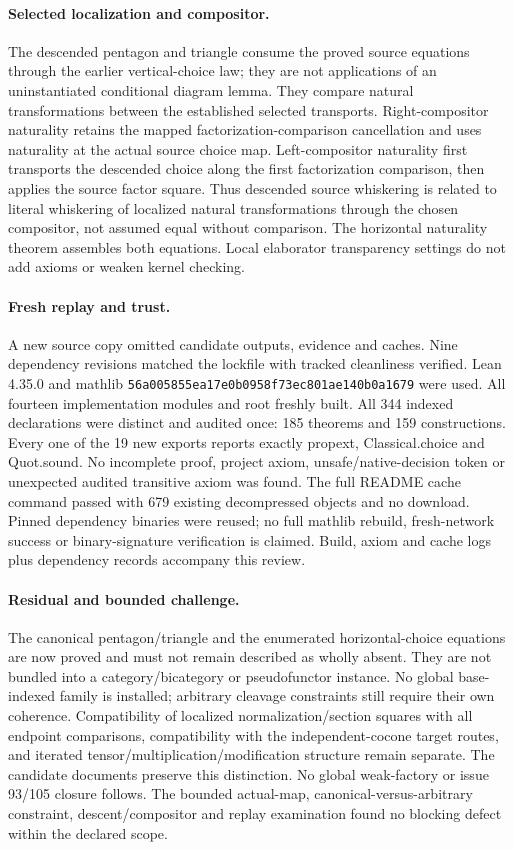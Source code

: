 \documentclass{article}
\begin{document}
\paragraph{Selected localization and compositor.} The descended pentagon and triangle consume the proved source equations through the earlier vertical-choice law; they are not applications of an uninstantiated conditional diagram lemma. They compare natural transformations between the established selected transports. Right-compositor naturality retains the mapped factorization-comparison cancellation and uses naturality at the actual source choice map. Left-compositor naturality first transports the descended choice along the first factorization comparison, then applies the source factor square. Thus descended source whiskering is related to literal whiskering of localized natural transformations through the chosen compositor, not assumed equal without comparison. The horizontal naturality theorem assembles both equations. Local elaborator transparency settings do not add axioms or weaken kernel checking.
\paragraph{Fresh replay and trust.} A new source copy omitted candidate outputs, evidence and caches. Nine dependency revisions matched the lockfile with tracked cleanliness verified. Lean 4.35.0 and mathlib \texttt{56a005855ea17e0b0958f73ec801ae140b0a1679} were used. All fourteen implementation modules and root freshly built. All 344 indexed declarations were distinct and audited once: 185 theorems and 159 constructions. Every one of the 19 new exports reports exactly propext, Classical.choice and Quot.sound. No incomplete proof, project axiom, unsafe/native-decision token or unexpected audited transitive axiom was found. The full README cache command passed with 679 existing decompressed objects and no download. Pinned dependency binaries were reused; no full mathlib rebuild, fresh-network success or binary-signature verification is claimed. Build, axiom and cache logs plus dependency records accompany this review.
\paragraph{Residual and bounded challenge.} The canonical pentagon/triangle and the enumerated horizontal-choice equations are now proved and must not remain described as wholly absent. They are not bundled into a category/bicategory or pseudofunctor instance. No global base-indexed family is installed; arbitrary cleavage constraints still require their own coherence. Compatibility of localized normalization/section squares with all endpoint comparisons, compatibility with the independent-cocone target routes, and iterated tensor/multiplication/modification structure remain separate. The candidate documents preserve this distinction. No global weak-factory or issue 93/105 closure follows. The bounded actual-map, canonical-versus-arbitrary constraint, descent/compositor and replay examination found no blocking defect within the declared scope.
\end{document}
